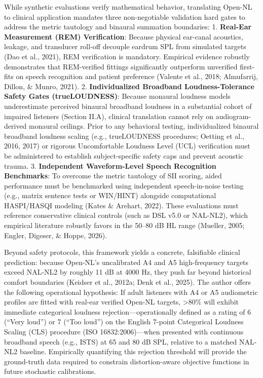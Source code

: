 \documentclass[
  12pt,
]{article}
\begin{document}
While synthetic evaluations verify mathematical behavior, translating
Open-NL to clinical application mandates three non-negotiable validation
hard gates to address the metric tautology and binaural summation
boundaries: 1. \textbf{Real-Ear Measurement (REM) Verification}: Because
physical ear-canal acoustics, leakage, and transducer roll-off decouple
eardrum SPL from simulated targets (Dao et al., 2021), REM verification
is mandatory. Empirical evidence robustly demonstrates that REM-verified
fittings significantly outperform unverified first-fits on speech
recognition and patient preference (Valente et al., 2018; Almufarrij,
Dillon, \& Munro, 2021). 2. \textbf{Individualized Broadband
Loudness-Tolerance Safety Gates (trueLOUDNESS)}: Because monaural
loudness models underestimate perceived binaural broadband loudness in a
substantial cohort of impaired listeners (Section II.A), clinical
translation cannot rely on audiogram-derived monaural ceilings. Prior to
any behavioral testing, individualized binaural broadband loudness
scaling (e.g., trueLOUDNESS procedures; Oetting et al., 2016, 2017) or
rigorous Uncomfortable Loudness Level (UCL) verification must be
administered to establish subject-specific safety caps and prevent
acoustic trauma. 3. \textbf{Independent Waveform-Level Speech
Recognition Benchmarks}: To overcome the metric tautology of SII
scoring, aided performance must be benchmarked using independent
speech-in-noise testing (e.g., matrix sentence tests or WIN/HINT)
alongside computational HASPI/HASQI modeling (Kates \& Arehart, 2022).
These evaluations must reference conservative clinical controls (such as
DSL v5.0 or NAL-NL2), which empirical literature robustly favors in the
50--80 dB HL range (Mueller, 2005; Engler, Digeser, \& Hoppe, 2026).

Beyond safety protocols, this framework yields a concrete, falsifiable
clinical prediction: because Open-NL's uncalibrated A4 and A5
high-frequency targets exceed NAL-NL2 by roughly 11 dB at 4000 Hz, they
push far beyond historical comfort boundaries (Keidser et al., 2012a;
Denk et al., 2025). The author offers the following operational
hypothesis: If adult listeners with A4 or A5 audiometric profiles are
fitted with real-ear verified Open-NL targets, \textgreater80\% will
exhibit immediate categorical loudness rejection---operationally defined
as a rating of 6 (``Very loud'') or 7 (``Too loud'') on the English
7-point Categorical Loudness Scaling (CLS) procedure (ISO
16832:2006)---when presented with continuous broadband speech (e.g.,
ISTS) at 65 and 80 dB SPL, relative to a matched NAL-NL2 baseline.
Empirically quantifying this rejection threshold will provide the
ground-truth data required to constrain distortion-aware objective
functions in future stochastic calibrations.
\end{document}
